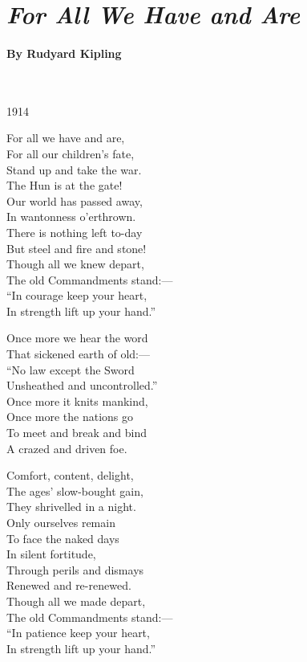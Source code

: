 \documentclass[11pt, letterpaper]{memoir}
\begin{document}
{\section*{\emph{For All We Have and Are}}
\paragraph{By Rudyard Kipling}~

\vspace{1em}
\begin{minipage}[t]{0.49\linewidth}
	{\large \hspace{2em}1914}
	
	For all we have and are,\\
	For all our children's fate,\\
	Stand up and take the war.\\
	The Hun is at the gate!\\
	Our world has passed away,\\
	In wantonness o'erthrown.\\
	There is nothing left to-day\\
	But steel and fire and stone!\\
	Though all we knew depart,\\
	The old Commandments stand:—\\
	“In courage keep your heart,\\
	In strength lift up your hand.”
	
	Once more we hear the word\\
	That sickened earth of old:—\\
	“No law except the Sword\\
	Unsheathed and uncontrolled.”\\
	Once more it knits mankind,\\
	Once more the nations go\\
	To meet and break and bind\\
	A crazed and driven foe.	
\end{minipage}
\begin{minipage}[t]{0.49\linewidth}
	Comfort, content, delight,\\
	The ages' slow-bought gain,\\
	They shrivelled in a night.\\
	Only ourselves remain\\
	To face the naked days\\
	In silent fortitude,\\
	Through perils and dismays\\
	Renewed and re-renewed.\\
	Though all we made depart,\\
	The old Commandments stand:—\\
	“In patience keep your heart,\\
	In strength lift up your hand.”
	

\end{minipage}}
\end{document}
